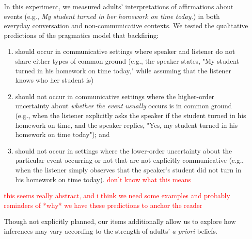 \documentclass[10pt,letterpaper]{article}
\newcommand{\red}[1]{\textcolor{Red}{#1}}
\begin{document}
In this experiment, we measured adults' interpretations of affirmations about events (e.g., \emph{My student turned in her homework on time today.}) in both everyday conversation and non-communicative contexts.  We tested the qualitative predictions of the pragmatics model that backfiring:
\begin{enumerate}
\item should occur in communicative settings where speaker and listener do not share either types of common ground (e.g., the speaker states, "My student turned in his homework on time today," while assuming that the listener knows who her student is)
\item should not occur in communicative settings where the higher-order uncertainty about \emph{whether the event usually} occurs is in common ground (e.g., when the listener explicitly asks the speaker if the student turned in his homework on time, and the speaker replies, "Yes, my student turned in his homework on time today"); and 
\item should not occur in settings where the lower-order uncertainty about the particular event occurring or not that are not explicitly communicative (e.g., when the listener simply observes that the speaker's student did not turn in his homework on time today). \red{don't know what this means}
\end{enumerate}


\red{this seems really abstract, and i think we need some examples and probably reminders of *why* we have these predictions to anchor the reader}

Though not explicitly planned, our items additionally allow us to explore how inferences may vary according to the strength of adults' \emph{a priori} beliefs.


\end{document}
